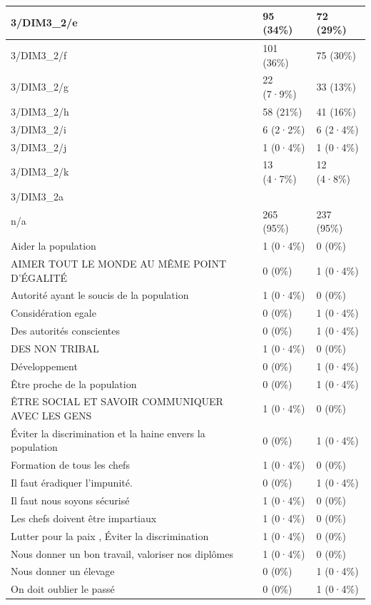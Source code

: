 \documentclass[
]{book}
\begin{document}
\begin{tabular}{l|l|l}
\hline
3/DIM3\_2/e & 95 (34\%) & 72 (29\%)\\
\hline
3/DIM3\_2/f & 101 (36\%) & 75 (30\%)\\
\hline
3/DIM3\_2/g & 22 (7·9\%) & 33 (13\%)\\
\hline
3/DIM3\_2/h & 58 (21\%) & 41 (16\%)\\
\hline
3/DIM3\_2/i & 6 (2·2\%) & 6 (2·4\%)\\
\hline
3/DIM3\_2/j & 1 (0·4\%) & 1 (0·4\%)\\
\hline
3/DIM3\_2/k & 13 (4·7\%) & 12 (4·8\%)\\
\hline
3/DIM3\_2a &  & \\
\hline
n/a & 265 (95\%) & 237 (95\%)\\
\hline
Aider la population & 1 (0·4\%) & 0 (0\%)\\
\hline
AIMER TOUT LE MONDE AU MÊME POINT D'ÉGALITÉ & 0 (0\%) & 1 (0·4\%)\\
\hline
Autorité ayant le soucis de la population & 1 (0·4\%) & 0 (0\%)\\
\hline
Considération  egale & 0 (0\%) & 1 (0·4\%)\\
\hline
Des autorités conscientes & 0 (0\%) & 1 (0·4\%)\\
\hline
DES NON TRIBAL & 1 (0·4\%) & 0 (0\%)\\
\hline
Développement & 0 (0\%) & 1 (0·4\%)\\
\hline
Être proche de la population & 0 (0\%) & 1 (0·4\%)\\
\hline
ÊTRE SOCIAL ET SAVOIR COMMUNIQUER AVEC LES GENS & 1 (0·4\%) & 0 (0\%)\\
\hline
Éviter la discrimination et la haine envers la population & 0 (0\%) & 1 (0·4\%)\\
\hline
Formation de tous les chefs & 1 (0·4\%) & 0 (0\%)\\
\hline
Il faut éradiquer l'impunité. & 0 (0\%) & 1 (0·4\%)\\
\hline
Il faut nous soyons sécurisé & 1 (0·4\%) & 0 (0\%)\\
\hline
Les chefs doivent être impartiaux & 1 (0·4\%) & 0 (0\%)\\
\hline
Lutter pour la paix , Éviter la discrimination & 1 (0·4\%) & 0 (0\%)\\
\hline
Nous donner un bon travail, valoriser nos diplômes & 1 (0·4\%) & 0 (0\%)\\
\hline
Nous donner un élevage & 0 (0\%) & 1 (0·4\%)\\
\hline
On doit oublier le passé & 0 (0\%) & 1 (0·4\%)\\

\end{tabular}
\end{document}
